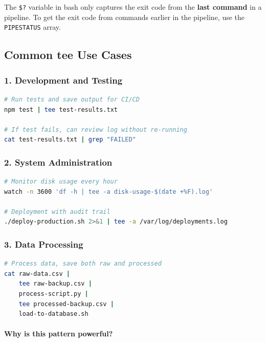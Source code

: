 \begin{warningbox}
	The \texttt{\$?} variable in bash only captures the exit code from the \textbf{last command} in a pipeline. To get the exit code from commands earlier in the pipeline, use the \texttt{PIPESTATUS} array.
\end{warningbox}

\subsection{Common tee Use Cases}

\subsubsection{1. Development and Testing}

\begin{lstlisting}[language=bash, caption={Testing with tee}]
# Run tests and save output for CI/CD
npm test | tee test-results.txt

# If test fails, can review log without re-running
cat test-results.txt | grep "FAILED"
\end{lstlisting}

\subsubsection{2. System Administration}

\begin{lstlisting}[language=bash, caption={System admin with tee}]
# Monitor disk usage every hour
watch -n 3600 'df -h | tee -a disk-usage-$(date +%F).log'

# Deployment with audit trail
./deploy-production.sh 2>&1 | tee -a /var/log/deployments.log
\end{lstlisting}

\subsubsection{3. Data Processing}

\begin{lstlisting}[language=bash, caption={Data processing with tee}]
# Process data, save both raw and processed
cat raw-data.csv |
    tee raw-backup.csv |
    process-script.py |
    tee processed-backup.csv |
    load-to-database.sh
\end{lstlisting}

\paragraph{Why is this pattern powerful?}

